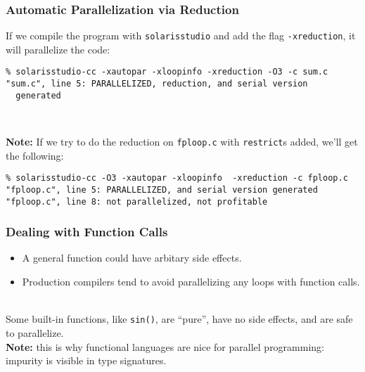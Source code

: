 \documentclass[aspectratio=43]{beamer}
\newenvironment{changemargin}[1]{%
  \begin{list}{}{%
    \setlength{\topsep}{0pt}%
    \setlength{\leftmargin}{#1}%
    \setlength{\rightmargin}{1em}
    \setlength{\listparindent}{\parindent}%
    \setlength{\itemindent}{\parindent}%
    \setlength{\parsep}{\parskip}%
  }%
  \item[]}{\end{list}}
\begin{document}
\begin{frame}[fragile]
  \frametitle{Automatic Parallelization via Reduction}

\begin{changemargin}{1.5cm}
  If we compile the program with {\tt solarisstudio} and add the flag
  {\tt -xreduction}, it will parallelize the code:
\end{changemargin}

  \begin{lstlisting}
% solarisstudio-cc -xautopar -xloopinfo -xreduction -O3 -c sum.c 
"sum.c", line 5: PARALLELIZED, reduction, and serial version
  generated
  \end{lstlisting}
~\\[1em]

\begin{changemargin}{1.5cm}
  {\bf Note:} If we try to do the reduction on {\tt fploop.c} with {\tt restrict}s added, we'll get the following:
\end{changemargin}

  \begin{lstlisting}
% solarisstudio-cc -O3 -xautopar -xloopinfo  -xreduction -c fploop.c
"fploop.c", line 5: PARALLELIZED, and serial version generated
"fploop.c", line 8: not parallelized, not profitable
  \end{lstlisting}

\end{frame}

\begin{frame}
  \frametitle{Dealing with Function Calls}

\begin{changemargin}{1.5cm}  
  \begin{itemize}
    \item A general function could have arbitary side effects.
    \item Production compilers tend to avoid parallelizing any loops with
      function calls.
  \end{itemize}
~\\[1em]

  Some built-in functions, like {\tt sin()}, are ``pure'', have no side
  effects, and are safe to parallelize.
~\\[1em]
  {\bf Note:} this is why functional languages are nice for parallel
  programming: impurity is visible in type signatures.
\end{changemargin}
\end{frame}
\end{document}
